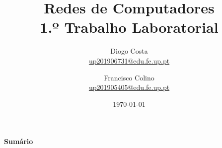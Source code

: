 \documentclass[a4paper,11pt,portuguese]{article}
\begin{document}

\author{
    Diogo Costa\\
    \href{mailto:up201906731@edu.fe.up.pt}{up201906731@edu.fe.up.pt}
    \and
    Francisco Colino\\
    \href{mailto:up201905405@edu.fe.up.pt}{up201905405@edu.fe.up.pt}
}
\title{Redes de Computadores \\ \large 1.º Trabalho Laboratorial}
\date{\today}
\maketitle

\begin{center}
    \textbf{Sumário}
\end{center}



\end{document}
